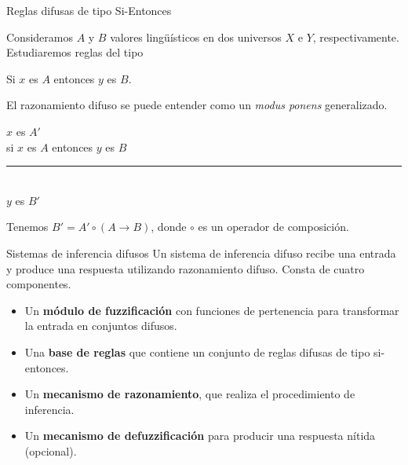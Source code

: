\documentclass[10pt, spanish]{beamer}
\begin{document}
\begin{frame}{Reglas difusas de tipo Si-Entonces}
  \begin{exampleblock}{\vspace*{-3ex}}

	Consideramos $A$ y $B$ valores lingüísticos en dos universos $X$ e $Y$, respectivamente. Estudiaremos reglas del tipo\\

\begin{center}
	Si $x$ es $A$ entonces $y$ es $B$.
\end{center}
\end{exampleblock}

\vspace{1em}
El razonamiento difuso se puede entender como un \textit{modus ponens} generalizado.
\vspace{-1em}
  \begin{exampleblock}{\vspace*{-3ex}}
\begin{center}
	$x$ es $A'$\\
    si $x$ es $A$ entonces $y$ es $B$\\
    \rule{5cm}{0.4pt}\\
    $y$ es $B'$
\end{center}

Tenemos $B' = A' \circ (A \to B)$, donde $\circ$ es un operador de composición.
\end{exampleblock}
\end{frame}

\begin{frame}{Sistemas de inferencia difusos}
	Un sistema de inferencia difuso recibe una entrada y produce una respuesta utilizando razonamiento difuso. Consta de cuatro componentes.

	\begin{itemize}
	\item Un \textbf{módulo de fuzzificación} con funciones de pertenencia para transformar la entrada en conjuntos difusos.
	\item Una \textbf{base de reglas} que contiene un conjunto de reglas difusas de tipo si-entonces.
	\item Un \textbf{mecanismo de razonamiento}, que realiza el procedimiento de inferencia.
  \item Un \textbf{mecanismo de defuzzificación} para producir una respuesta nítida (opcional).
\end{itemize}

\end{frame}
\end{document}
